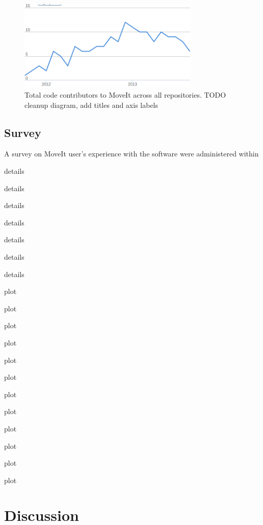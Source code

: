 \documentclass[10pt,journal,compsoc]{joser1}
\begin{document}
{\begin{figure}[!t]
\centering
\includegraphics[width=3.4in]{images/contributors}
\caption{Total code contributors to MoveIt across all repositories. TODO cleanup diagram, add titles and axis labels}
\label{fig:contributors}
\end{figure}


\subsection{Survey}
\label{sec::survey}

A survey on MoveIt user's experience with the software were administered within

details

details

details

details

details

details

details

plot 

plot 

plot 

plot 

plot 

plot 

plot 

plot 

plot 

plot 

plot 

plot 

\section{Discussion}
\label{sec::discussion}

}
\end{document}
